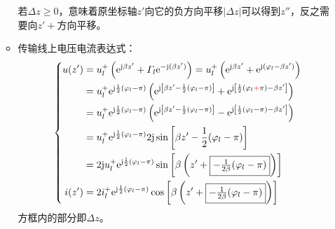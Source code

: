 \begin{enumerate}
\begin{itemize}
                若$\Delta z\geqslant0$，意味着原坐标轴$z'$向它的负方向平移$|\Delta z|$可以得到$z''$，反之需要向$z'+$方向平移。
            \item 传输线上电压电流表达式：
                \begin{subequations}
                        \begin{equation*}
                            \left\{
                        \begin{aligned}
                            u(z')&=u^+_l\left(\mathrm{e}^{\mathrm{j}\beta z'}+\varGamma_l\mathrm{e}^{-\mathrm{j}(\beta z')} \right)=u^+_l\left(\mathrm{e}^{\mathrm{j}\beta z'}+\mathrm{e}^{\mathrm{j}(\varphi_l-\beta z')} \right)\\
                            &=u^+_l \mathrm{e}^{\mathrm{j}\frac{1}{2}(\varphi_l-\pi)}\left(\mathrm{e}^{\mathrm{j}\left[\beta z'-\frac{1}{2}(\varphi_l-\pi)\right]}+\mathrm{e}^{\mathrm{j}\left[\frac{1}{2}(\varphi_l{\color{red}+}\pi)-\beta z'\right]} \right)\\
                            &=u^+_l \mathrm{e}^{\mathrm{j}\frac{1}{2}(\varphi_l-\pi)}\left(\mathrm{e}^{\mathrm{j}\left[\beta z'-\frac{1}{2}(\varphi_l-\pi)\right]}-\mathrm{e}^{\mathrm{j}\left[\frac{1}{2}(\varphi_l-\pi)-\beta z'\right]} \right)\\
                            &=u^+_l \mathrm{e}^{\mathrm{j}\frac{1}{2}(\varphi_l-\pi)}2 \mathrm{j}\sin{\left[\beta z'-\frac{1}{2}(\varphi_l-\pi) \right]}\\
                            &=2 \mathrm{j}u^+_l \mathrm{e}^{\mathrm{j}\frac{1}{2}(\varphi_l-\pi)}\sin{\left[\beta \left(z'+\fbox{$-\frac{1}{2\beta}(\varphi_l-\pi)$}\right) \right]}\\
                            i(z')&=2i^+_l\mathrm{e}^{\mathrm{j}\frac{1}{2}(\varphi_l-\pi)}\cos{\left[\beta \left(z'+\fbox{$-\frac{1}{2\beta}(\varphi_l-\pi)$}\right) \right]}
                    \end{aligned}\right.
                    \end{equation*}
                \end{subequations}
                方框内的部分即$\Delta z$。

\end{itemize}
\end{enumerate}
